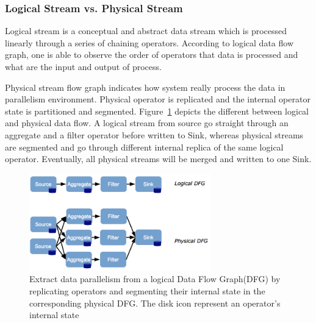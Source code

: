 

\subsubsection*{Logical Stream vs. Physical Stream}

Logical stream is a conceptual and abstract data stream which is processed linearly through a series of chaining operators. According to logical data flow graph, one is able to observe the order of operators that data is processed and what are the input and output of process.

Physical stream flow graph indicates how system really process the data in parallelism environment. Physical operator is replicated and the internal operator state is partitioned and segmented. Figure~\ref{fig:streamRepresent} depicts the different between logical and physical data flow.
A logical stream from source go straight through an aggregate and a filter operator before written to Sink, whereas physical streams are segmented and go through different internal replica of the same logical operator. Eventually, all physical streams will be merged and written to one Sink. 


\begin{figure}[htbp!] 
\centering    
\includegraphics[width=0.7\textwidth]{logicalPhysicalDataFlow}
\caption[Logical and Physical Stream]{Extract data parallelism from a logical Data Flow Graph(DFG) by replicating operators and segmenting their internal state in the corresponding physical DFG. The disk icon represent an operator's internal state~\citep{Henrique:2013}}
\label{fig:streamRepresent}
\end{figure}

